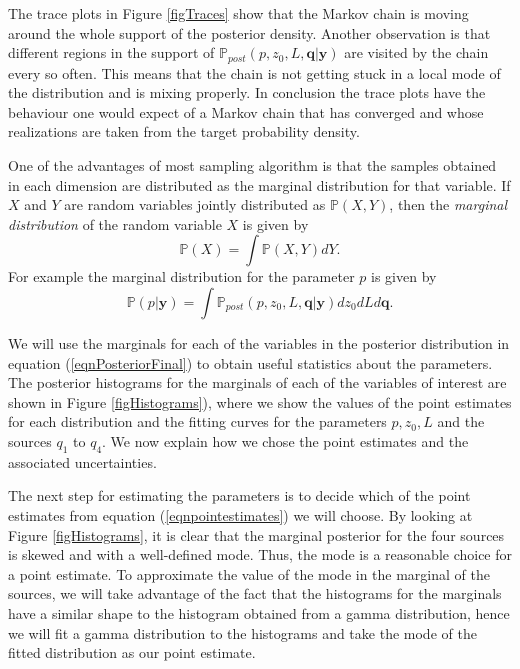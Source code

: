 \documentclass{sfuthesis}
\newcommand{\post}{\mathbb{P}_{post}}
\newcommand{\p}{\mathbb{P}}
\newcommand{\q}{\textbf{q}}
\newcommand{\pars}{p,z_{0},L}
\newcommand{\y}{\textbf{y}}
\begin{document}
The trace plots in Figure \ref{figTraces} show that the Markov chain is moving around the whole 
support of the posterior density. Another observation is that different regions in the support
of $\post(\pars,\q|\y)$ are visited by the chain every so often. This means
that the chain is not getting stuck in a local mode of the distribution and is mixing properly. In conclusion the 
trace plots have the behaviour one would expect of a Markov chain that has converged
and whose realizations are taken from the  target probability density. 

One of the advantages of most sampling algorithm is that the samples
obtained in each dimension are distributed as the marginal distribution
for that variable. If $X$ and $Y$ are random variables jointly distributed 
as $\p(X,Y)$, then
the \textit{marginal distribution} of the random variable $X$ is given by
\begin{equation*}
\p(X)=\int\p(X,Y)dY.
\end{equation*}
For example the marginal distribution for the parameter $p$ is given by
\begin{equation*}
\p(p|\y)=\int\post(\pars,\q|\y)dz_{0}dLd\q.
\end{equation*}

We will
 use the marginals for each of the variables in the posterior distribution
in equation (\ref{eqnPosteriorFinal}) to obtain useful statistics about the 
parameters.
The  posterior histograms
for the   marginals  of each of the variables of interest  are shown
in Figure \ref{figHistograms}), where we show the values of the point
estimates for each distribution and the fitting curves for the parameters $\pars$
and the sources $q_{1}$ to $q_{4}$. We now explain how we chose the point
estimates and the associated uncertainties.

The next step for estimating the parameters is to decide which of the point estimates from equation (\ref{eqnpointestimates})
we will choose. By looking at Figure \ref{figHistograms},
it is clear that the  marginal posterior for the four sources is skewed and with a well-defined mode.
Thus, the mode is a reasonable choice for a point estimate. To approximate the 
value of the mode in the marginal of the sources, we will take
advantage of the fact that the histograms for the marginals have a similar
shape to the histogram obtained from a gamma distribution, hence  we will fit a
 gamma distribution  to the histograms and
take  the mode of the fitted distribution as our point estimate.
\end{document}
